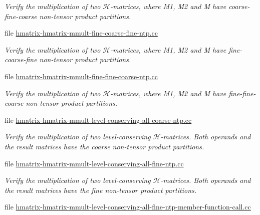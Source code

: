 \begin{DoxyCompactItemize}
\begin{DoxyCompactList}\small\item\em Verify the multiplication of two $\mathcal{H}$-\/matrices, where M1, M2 and M have coarse-\/fine-\/coarse non-\/tensor product partitions. \end{DoxyCompactList}\item 
file \hyperlink{hmatrix-hmatrix-mmult-fine-coarse-fine-ntp_8cc}{hmatrix-\/hmatrix-\/mmult-\/fine-\/coarse-\/fine-\/ntp.\+cc}
\begin{DoxyCompactList}\small\item\em Verify the multiplication of two $\mathcal{H}$-\/matrices, where M1, M2 and M have fine-\/coarse-\/fine non-\/tensor product partitions. \end{DoxyCompactList}\item 
file \hyperlink{hmatrix-hmatrix-mmult-fine-fine-coarse-ntp_8cc}{hmatrix-\/hmatrix-\/mmult-\/fine-\/fine-\/coarse-\/ntp.\+cc}
\begin{DoxyCompactList}\small\item\em Verify the multiplication of two $\mathcal{H}$-\/matrices, where M1, M2 and M have fine-\/fine-\/coarse non-\/tensor product partitions. \end{DoxyCompactList}\item 
file \hyperlink{hmatrix-hmatrix-mmult-level-conserving-all-coarse-ntp_8cc}{hmatrix-\/hmatrix-\/mmult-\/level-\/conserving-\/all-\/coarse-\/ntp.\+cc}
\begin{DoxyCompactList}\small\item\em Verify the multiplication of two level-\/conserving $\mathcal{H}$-\/matrices. Both operands and the result matrices have the coarse non-\/tensor product partitions. \end{DoxyCompactList}\item 
file \hyperlink{hmatrix-hmatrix-mmult-level-conserving-all-fine-ntp_8cc}{hmatrix-\/hmatrix-\/mmult-\/level-\/conserving-\/all-\/fine-\/ntp.\+cc}
\begin{DoxyCompactList}\small\item\em Verify the multiplication of two level-\/conserving $\mathcal{H}$-\/matrices. Both operands and the result matrices have the fine non-\/tensor product partitions. \end{DoxyCompactList}\item 
file \hyperlink{hmatrix-hmatrix-mmult-level-conserving-all-fine-ntp-member-function-call_8cc}{hmatrix-\/hmatrix-\/mmult-\/level-\/conserving-\/all-\/fine-\/ntp-\/member-\/function-\/call.\+cc}

\end{DoxyCompactItemize}
